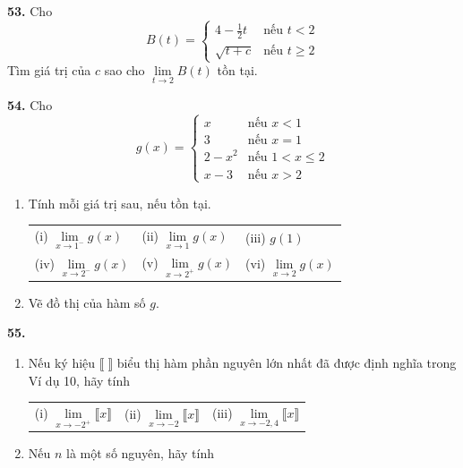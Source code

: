 \begin{minipage}[t]{0.485\textwidth}
\vspace{6pt}
\textbf{53.} Cho
\[
B(t) = \begin{cases}
4 - \frac{1}{2}t & \text{nếu } t < 2 \\
\sqrt{t + c} & \text{nếu } t \ge 2
\end{cases}
\]
Tìm giá trị của $c$ sao cho $\lim\limits_{t \to 2} B(t)$ tồn tại.

\vspace{6pt}
\textbf{54.} Cho
\[
g(x) = \begin{cases}
x & \text{nếu } x < 1 \\
3 & \text{nếu } x = 1 \\
2 - x^2 & \text{nếu } 1 < x \le 2 \\
x - 3 & \text{nếu } x > 2
\end{cases}
\]
\begin{enumerate}[label=\textnormal{(\alph*)}, nosep, leftmargin=1.5em]
    \item Tính mỗi giá trị sau, nếu tồn tại.
    \vspace{1pt}
    
    \begin{tabularx}{\linewidth}{@{}XXX@{}}
    (i) $\lim\limits_{x \to 1^-} g(x)$ & (ii) $\lim\limits_{x \to 1} g(x)$ & (iii) $g(1)$ \\[4pt]
    (iv) $\lim\limits_{x \to 2^-} g(x)$ & (v) $\lim\limits_{x \to 2^+} g(x)$ & (vi) $\lim\limits_{x \to 2} g(x)$
    \end{tabularx}
    \vspace{1pt}
    \item Vẽ đồ thị của hàm số $g$.
\end{enumerate}

\vspace{6pt}
\textbf{55.} \begin{enumerate}[label=\textnormal{(\alph*)}, nosep, leftmargin=1.5em]
    \item Nếu ký hiệu $\llbracket \; \rrbracket$ biểu thị hàm phần nguyên lớn nhất đã được định nghĩa trong Ví dụ 10, hãy tính
    \vspace{1pt}
    
    \begin{tabularx}{\linewidth}{@{}XXX@{}}
    (i) $\lim\limits_{x \to -2^+} \llbracket x \rrbracket$ & (ii) $\lim\limits_{x \to -2} \llbracket x \rrbracket$ & (iii) $\lim\limits_{x \to -2{,}4} \llbracket x \rrbracket$
    \end{tabularx}
    \vspace{1pt}
    \item Nếu $n$ là một số nguyên, hãy tính
    \vspace{1pt}
    

\end{enumerate}
\end{minipage}
